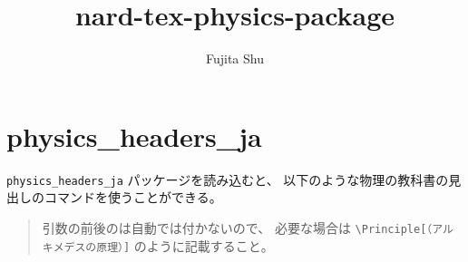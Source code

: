 \documentclass[oneside,10pt,a4paper]{jsarticle}
\title{nard-tex-physics-package}
\author{Fujita Shu}
\begin{document}
  \maketitle

  \section{physics\_headers\_ja}

  \verb|physics_headers_ja| パッケージを読み込むと、%
  以下のような物理の教科書の見出しのコマンドを使うことができる。

  {\footnotesize
  \begin{quote}
    引数の前後のは自動では付かないので、%
    必要な場合は \verb|\Principle[（アルキメデスの原理）]| のように記載すること。
  \end{quote}
  }
\end{document}
